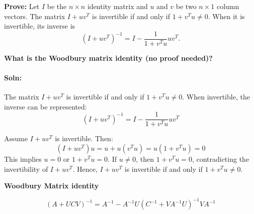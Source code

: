 \documentclass[12pt,letterpaper]{article}
\begin{document}

\vspace{1.2cm}

\textbf{Prove:} Let \( I \) be the \( n \times n \) identity matrix and \( u \) and \( v \) be two \( n \times 1 \) column vectors. The matrix \( I + uv^T \) is invertible if and only if \( 1 + v^T u \neq 0 \). When it is invertible, its inverse is
\[
(I + uv^T)^{-1} = I - \frac{1}{1 + v^T u} uv^T.
\]

\textbf{What is the Woodbury matrix identity (no proof needed)?}

\paragraph*{Soln:}
The matrix \(I + uv^T\) is invertible if and only if \(1 + v^Tu \neq 0\). When invertible, the inverse can be represented: 
\[
(I + uv^T)^{-1} = I - \frac{1}{1+v^Tu}uv^T
\]


Assume \( I + uv^T \) is invertible. Then:
\[
    (I + uv^T)u = u + u(v^T u) = u(1 + v^T u) = 0
\]
This implies \( u = 0 \) or \( 1 + v^T u = 0 \). If \( u \neq 0 \), then \( 1 + v^T u = 0 \), contradicting the invertibility of \( I + uv^T \). Hence, \( I + uv^T \) is invertible if and only if \( 1 + v^T u \neq 0 \).

\vspace{.5cm}

\textbf{Woodbury Matrix identity}

\[
\boxed{
    (A+UCV)^{-1} = A^{-1} - A^{-1}U(C^{-1} + VA^{-1}U)^{-1}VA^{-1}
}
\]
\end{document}
